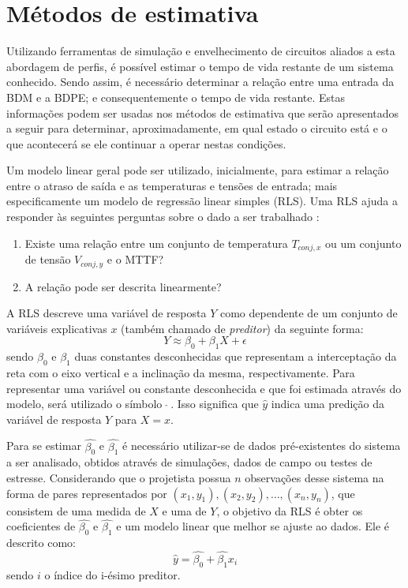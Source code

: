 \section{Métodos de estimativa}
\label{section_metodos_estimativa}
Utilizando ferramentas de simulação e envelhecimento de circuitos aliados a esta abordagem de perfis, é possível estimar o tempo de vida restante de um sistema conhecido. Sendo assim, é necessário determinar a relação entre uma entrada da BDM e a BDPE; e consequentemente o tempo de vida restante. Estas informações podem ser usadas nos métodos de estimativa que serão apresentados a seguir para determinar, aproximadamente, em qual estado o circuito está e o que acontecerá se ele continuar a operar nestas condições.

Um modelo linear geral \cite{McCullagh1984} pode ser utilizado, inicialmente, para estimar a relação entre o atraso de saída e as temperaturas e tensões de entrada; mais especificamente um modelo de regressão linear simples (RLS). Uma RLS ajuda a responder às seguintes perguntas sobre o dado a ser trabalhado \cite{James2013}:
\begin{enumerate}
	\item Existe uma relação entre um conjunto de temperatura $T_{conj,x}$ ou um conjunto de tensão $V_{conj,y}$ e o MTTF?
	\item A relação pode ser descrita linearmente?
\end{enumerate}
A RLS descreve uma variável de resposta $Y$ como dependente de um conjunto de variáveis explicativas $x$ (também chamado de \textit{preditor}) da seguinte forma:
\begin{equation}
\label{eq:regressao_linear_simples}
Y \approx \beta_0+\beta_1X + \epsilon
\end{equation}
sendo $\beta_0$ e $\beta_1$ duas constantes desconhecidas que representam a interceptação da reta com o eixo vertical e a inclinação da mesma, respectivamente. Para representar uma variável ou constante desconhecida e que foi estimada através do modelo, será utilizado o símbolo$\ $ $\hat{}$$\ $. Isso significa que $\hat{y}$ indica uma predição da variável de resposta $Y$ para $X = x$.

Para se estimar $\hat{\beta_0}$ e $\hat{\beta_1}$ é necessário utilizar-se de dados pré-existentes do sistema a ser analisado, obtidos através de simulações, dados de campo ou testes de estresse. Considerando que o projetista possua $n$ observações desse sistema na forma de pares representados por $(x_1,y_1),(x_2,y_2),\dots,(x_n,y_n)$, que consistem de uma medida de $X$ e uma de $Y$, o objetivo da RLS é obter os coeficientes de $\hat{\beta_0}$ e $\hat{\beta_1}$ e um modelo linear que melhor se ajuste ao dados. Ele é descrito como:
\begin{equation}
\label{eq:RLS_estimado}
\hat{y} =\hat{\beta_0}+\hat{\beta_1}x_i
\end{equation}
sendo $i$ o índice do i-ésimo preditor.


